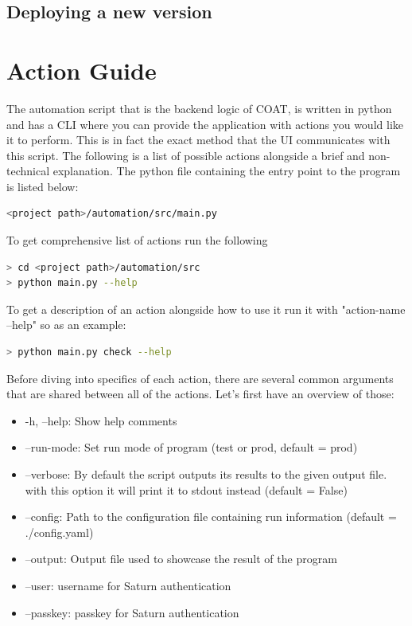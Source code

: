 \documentclass[12pt,a4paper]{article}
\begin{document}
\subsection{Deploying a new version}



\section{Action Guide}
The automation script that is the backend logic of COAT, is written
in python and has a CLI where you can provide the application with actions
you would like it to perform. This is in fact the exact method that the UI 
communicates with this script. The following is a list of possible actions
alongside a brief and non-technical explanation. The python file containing
the entry point to the program is listed below:
\begin{lstlisting}[language=bash]
<project path>/automation/src/main.py
\end{lstlisting}
To get comprehensive list of actions run the following
\begin{lstlisting}[language=bash]
> cd <project path>/automation/src
> python main.py --help
\end{lstlisting}
To get a description of an action alongside how to use it run it with "action-name --help"
so as an example:
\begin{lstlisting}[language=bash]
> python main.py check --help
\end{lstlisting}
Before diving into specifics of each action,  there are several common arguments
that are shared between all of the actions. Let's first have an overview of those:
\begin{itemize}
  \item -h, --help: Show help comments
  \item --run-mode: Set run mode of program (test or prod, default = prod)
  \item --verbose: By default the script outputs its results to the given output file.
                   with this option it will print it to stdout instead (default = False)
  \item --config: Path to the configuration file containing run information (default = ./config.yaml)
  \item --output: Output file used to showcase the result of the program
  \item --user: username for Saturn authentication
  \item --passkey: passkey for Saturn authentication 
\end{itemize}
\end{document}
